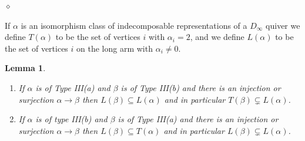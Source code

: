 \documentclass{article}
\newtheorem{lemma}{Lemma}[section]
\newenvironment{proof}{\vspace*{2ex}\noindent {\em Proof:}
}{\hfill $\diamond$ \\[2ex]}
\begin{document}
\begin{proof}

  
\end{proof}

If $\alpha$ is an isomorphism class of indecomposable representations of a $D_\infty$ quiver we define $T(\alpha)$ to be the set of vertices $i$ with $\alpha_i = 2$, and we define $L(\alpha)$ to be the set of vertices $i$ on the long arm with $\alpha_i \neq 0$. 

\begin{lemma}\label{lem: types iii a and iii b mixed}
\
\begin{enumerate}
    \item If $\alpha$ is of Type III(a) and $\beta$ is of Type III(b) and there is an injection or surjection $\alpha \to \beta$ then $L(\beta) \subseteq L(\alpha)$ and in particular $T(\beta) \subsetneq L(\alpha)$.  
    \item If $\alpha$ is of type III(b) and $\beta$ is of Type III(a) and there is an injection or surjection $\alpha \to \beta$ then $L(\beta) \subseteq T(\alpha)$ and in particular $L(\beta) \subsetneq L(\alpha)$.  
\end{enumerate}
\end{lemma}
\end{document}
